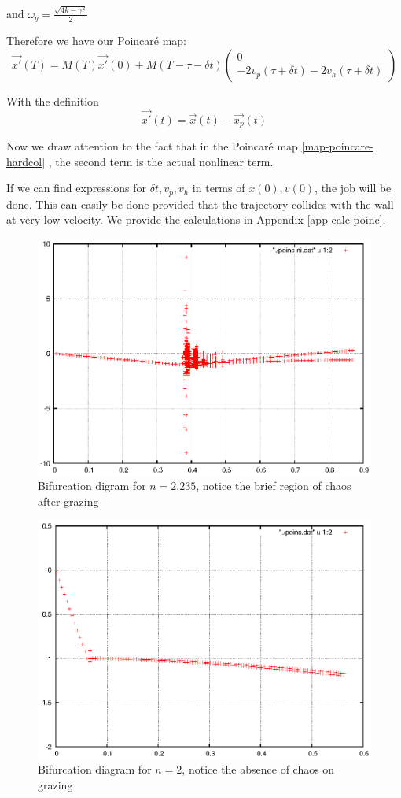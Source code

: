 \documentclass{book}
\renewcommand{\(}{\begin{columns}}
\renewcommand{\)}{\end{columns}}
\newcommand{\<}[1]{\begin{column}{#1}}
\renewcommand{\>}{\end{column}}
\newcommand{\colv}[2]{\begin{pmatrix}#1\\#2\end{pmatrix}}
\begin{document}
and
$\omega_g=\frac{\sqrt{4k-\gamma^2}}{2}$
 
Therefore we have our Poincaré map:
\begin{equation}
\label{map-poincare-hardcol}
\vec{x'}(T)=M(T)\vec{x'}(0)+M(T-\tau-\delta t)\colv{0}{-2v_p(\tau+\delta t)-2v_h(\tau+\delta t)}
\end{equation}

With the definition
\[
\vec{x'}(t)=\vec{x}(t)-\vec{x_p}(t)
\]

Now we draw attention to the fact that in the Poincaré map 
\eqref{map-poincare-hardcol} , the second term is the actual nonlinear term.  

If we can find expressions for $\delta t, v_p, v_h$ in terms of $x(0),v(0)$, 
the job will be done.  This can easily be done provided that the trajectory 
collides with the wall at very low velocity.  We provide the calculations in 
Appendix \ref{app-calc-poinc}.
 


\begin{figure}[!htp]
\begin{center}
\caption{Bifurcation digram for $n=2.235$, notice the brief region of chaos after grazing}
\label{fig-bif-int}
\includegraphics[width=0.6\columnwidth]{after-graz-non-int}
\end{center}
\end{figure}

\begin{figure}[!htb]
\begin{center}
\caption{Bifurcation diagram for $n=2$, notice the absence of chaos on grazing}
\label{fig-bif-nonint}
\includegraphics[width=0.6\columnwidth]{after-graz-int}
\end{center}
\end{figure}
\end{document}
